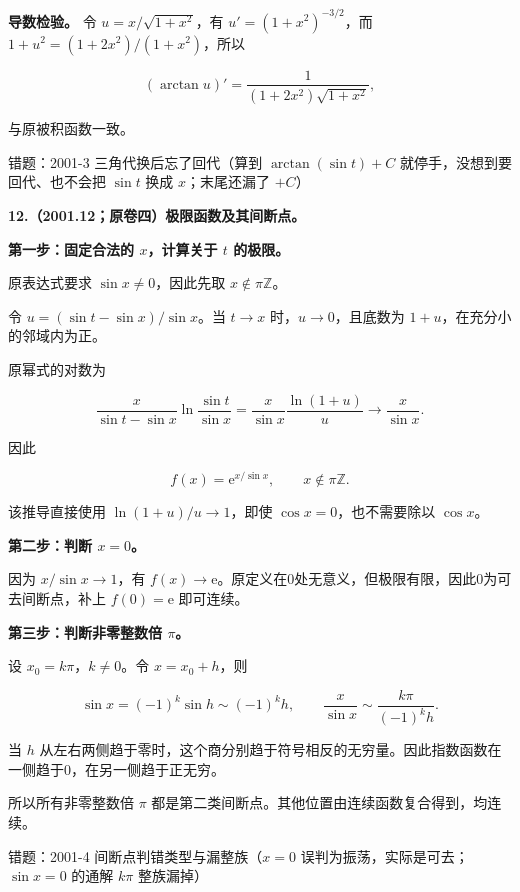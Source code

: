 \documentclass[UTF8,11pt,fontset=windows]{ctexart}
\begin{document}
\textbf{导数检验。} 令 $u=x/\sqrt{1+x^2}$，有 $u'=(1+x^2)^{-3/2}$，而 $1+u^2=(1+2x^2)/(1+x^2)$，所以

$$
(\arctan u)'=\frac1{(1+2x^2)\sqrt{1+x^2}},
$$

与原被积函数一致。

\begingroup\color{gray}错题：2001-3 三角代换后忘了回代（算到 $\arctan(\sin t)+C$ 就停手，没想到要回代、也不会把 $\sin t$ 换成 $x$；末尾还漏了 $+C$）\par\endgroup

\clearpage

\textbf{12.（2001.12；原卷四）极限函数及其间断点。}

\textbf{第一步：固定合法的 $x$，计算关于 $t$ 的极限。}

原表达式要求 $\sin x\ne0$，因此先取 $x\notin\pi\mathbb Z$。

令 $u=(\sin t-\sin x)/\sin x$。当 $t\to x$ 时，$u\to0$，且底数为 $1+u$，在充分小的邻域内为正。

原幂式的对数为

$$
\frac{x}{\sin t-\sin x}\ln\frac{\sin t}{\sin x}
=\frac{x}{\sin x}\frac{\ln(1+u)}u
\longrightarrow\frac{x}{\sin x}.
$$

因此

$$
f(x)=\mathrm e^{x/\sin x},\qquad x\notin\pi\mathbb Z.
$$

该推导直接使用 $\ln(1+u)/u\to1$，即使 $\cos x=0$，也不需要除以 $\cos x$。

\textbf{第二步：判断 $x=0$。}

因为 $x/\sin x\to1$，有 $f(x)\to\mathrm e$。原定义在0处无意义，但极限有限，因此0为可去间断点，补上 $f(0)=\mathrm e$ 即可连续。

\textbf{第三步：判断非零整数倍 $\pi$。}

设 $x_0=k\pi$，$k\ne0$。令 $x=x_0+h$，则

$$
\sin x=(-1)^k\sin h\sim(-1)^kh,
\qquad\frac{x}{\sin x}\sim\frac{k\pi}{(-1)^k h}.
$$

当 $h$ 从左右两侧趋于零时，这个商分别趋于符号相反的无穷量。因此指数函数在一侧趋于0，在另一侧趋于正无穷。

所以所有非零整数倍 $\pi$ 都是第二类间断点。其他位置由连续函数复合得到，均连续。

\begingroup\color{gray}错题：2001-4 间断点判错类型与漏整族（$x=0$ 误判为振荡，实际是可去；$\sin x=0$ 的通解 $k\pi$ 整族漏掉）\par\endgroup
\end{document}
